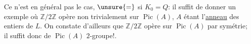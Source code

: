 Ce n'est en général pas le cas, $\unsure{=}$ si $K_0=Q$: il suffit de donner un exemple où $\mathbb Z/2\mathbb Z$ opère non trivialement sur $\operatorname{Pic}(A)$, $A$ étant l'\uline{anneau}  des entiers de $L$. On constate d'ailleurs que $\mathbb Z/2\mathbb Z$ opère sur $\operatorname{Pic}(A)$ par symétrie; il suffit donc de  $\operatorname{Pic}(A)$  $2$-groupe!.
